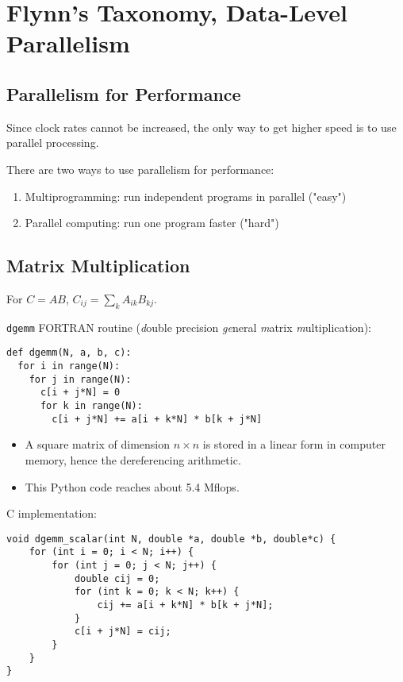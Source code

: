 \chapter{Flynn's Taxonomy, Data-Level Parallelism}

\section{Parallelism for Performance}
Since clock rates cannot be increased, the only way to get higher speed is to use parallel processing.

There are two ways to use parallelism for performance:
\begin{enumerate}
	\item Multiprogramming: run independent programs in parallel ("easy")
	\item Parallel computing: run one program faster ("hard")
\end{enumerate}


\section{Matrix Multiplication}
For \(C = AB\), \(C_{ij} = \sum_k A_{ik}B_{kj}\).

\medskip
\texttt{dgemm} FORTRAN routine (\emph{d}ouble precision \emph{ge}neral \emph{m}atrix \emph{m}ultiplication): 

\begin{verbatim}
def dgemm(N, a, b, c):
  for i in range(N):
    for j in range(N):
      c[i + j*N] = 0
      for k in range(N):
        c[i + j*N] += a[i + k*N] * b[k + j*N]
\end{verbatim}
\begin{itemize}
	\item A square matrix of dimension \(n\times n\) is stored in a linear form in computer memory, hence the dereferencing arithmetic.
	\item This Python code reaches about 5.4 Mflops.
\end{itemize}

C implementation:

\begin{verbatim}
void dgemm_scalar(int N, double *a, double *b, double*c) {
	for (int i = 0; i < N; i++) {
		for (int j = 0; j < N; j++) {
			double cij = 0;
			for (int k = 0; k < N; k++) {
			    cij += a[i + k*N] * b[k + j*N];
			}
			c[i + j*N] = cij;
		}
	}
}
\end{verbatim}

